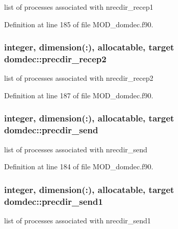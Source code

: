 list of processes associated with nrecdir\-\_\-recep1 



Definition at line 185 of file M\-O\-D\-\_\-domdec.\-f90.

\hypertarget{classdomdec_a851d5a5f2c7eb233e9e3e54770d57f0f}{
\subsubsection[{precdir\-\_\-recep2}]{\setlength{\rightskip}{0pt plus 5cm}integer, dimension(\-:), allocatable, target domdec\-::precdir\-\_\-recep2}}\label{classdomdec_a851d5a5f2c7eb233e9e3e54770d57f0f}


list of processes associated with nrecdir\-\_\-recep2 



Definition at line 187 of file M\-O\-D\-\_\-domdec.\-f90.

\hypertarget{classdomdec_a197dc0ce20dbc808eecabcf74df5960c}{
\subsubsection[{precdir\-\_\-send}]{\setlength{\rightskip}{0pt plus 5cm}integer, dimension(\-:), allocatable, target domdec\-::precdir\-\_\-send}}\label{classdomdec_a197dc0ce20dbc808eecabcf74df5960c}


list of processes associated with nrecdir\-\_\-send 



Definition at line 184 of file M\-O\-D\-\_\-domdec.\-f90.

\hypertarget{classdomdec_a7d3fe3da2fd8976c2169e00a21944c50}{
\subsubsection[{precdir\-\_\-send1}]{\setlength{\rightskip}{0pt plus 5cm}integer, dimension(\-:), allocatable, target domdec\-::precdir\-\_\-send1}}\label{classdomdec_a7d3fe3da2fd8976c2169e00a21944c50}


list of processes associated with nrecdir\-\_\-send1 



